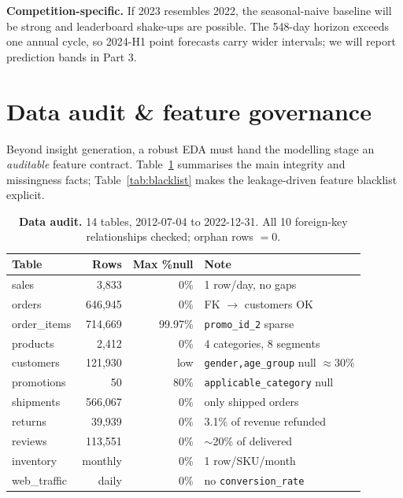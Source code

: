 \documentclass[10pt,a4paper,twocolumn]{article}
\begin{document}
\textbf{Competition-specific.} If 2023 resembles 2022, the seasonal-naive baseline will be strong and leaderboard shake-ups are possible. The 548-day horizon exceeds one annual cycle, so 2024-H1 point forecasts carry wider intervals; we will report prediction bands in Part 3.

\section{Data audit \& feature governance}

Beyond insight generation, a robust EDA must hand the modelling stage an \emph{auditable} feature contract. Table~\ref{tab:audit} summarises the main integrity and missingness facts; Table~\ref{tab:blacklist} makes the leakage-driven feature blacklist explicit.

\begin{table}[h]
  \footnotesize
  \caption{\textbf{Data audit.} 14 tables, 2012-07-04 to 2022-12-31. All 10 foreign-key relationships checked; orphan rows $=0$.}
  \label{tab:audit}
  \begin{tabular}{@{}l r r l@{}}
    \toprule
    \textbf{Table} & \textbf{Rows} & \textbf{Max \%null} & \textbf{Note} \\
    \midrule
    sales                 & 3{,}833   & 0\%    & 1 row/day, no gaps \\
    orders                & 646{,}945 & 0\%    & FK $\to$ customers OK \\
    order\_items          & 714{,}669 & 99.97\% & \texttt{promo\_id\_2} sparse \\
    products              & 2{,}412   & 0\%    & 4 categories, 8 segments \\
    customers             & 121{,}930 & low    & \texttt{gender,age\_group} null $\approx30\%$ \\
    promotions            & 50        & 80\%   & \texttt{applicable\_category} null \\
    shipments             & 566{,}067 & 0\%    & only shipped orders \\
    returns               & 39{,}939  & 0\%    & 3.1\% of revenue refunded \\
    reviews               & 113{,}551 & 0\%    & $\sim$20\% of delivered \\
    inventory             & monthly   & 0\%    & 1 row/SKU/month \\
    web\_traffic          & daily     & 0\%    & no \texttt{conversion\_rate} \\
    \bottomrule
  \end{tabular}
\end{table}
\end{document}
